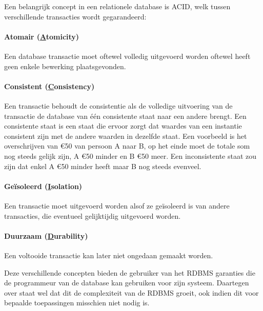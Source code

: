 Een belangrijk concept in een relationele database is ACID, welk tussen verschillende transacties wordt gegarandeerd:

\paragraph{Atomair (\underline{A}tomicity)} Een database transactie moet oftewel volledig uitgevoerd worden oftewel heeft geen enkele bewerking plaatsgevonden. 

\paragraph{Consistent (\underline{C}onsistency)} Een transactie behoudt de consistentie als de volledige uitvoering van de transactie de database van één consistente staat naar een andere brengt. Een consistente staat is een staat die ervoor zorgt dat waardes van een instantie consistent zijn met de andere waarden in dezelfde staat. Een voorbeeld is het overschrijven van \euro{50} van persoon A naar B, op het einde moet de totale som nog steeds gelijk zijn, A \euro{50} minder en B \euro{50} meer. Een inconsistente staat zou zijn dat enkel A \euro{50} minder heeft maar B nog steeds evenveel. 

\paragraph{Geïsoleerd (\underline{I}solation)} Een transactie moet uitgevoerd worden alsof ze geïsoleerd is van andere transacties, die eventueel gelijktijdig uitgevoerd worden. 

\paragraph{Duurzaam (\underline{D}urability)} Een voltooide transactie kan later niet ongedaan gemaakt worden.

Deze verschillende concepten bieden de gebruiker van het RDBMS garanties die de programmeur van de database kan gebruiken voor zijn systeem. Daartegen over staat wel dat dit de complexiteit van de RDBMS groeit, ook indien dit voor bepaalde toepassingen misschien niet nodig is.

